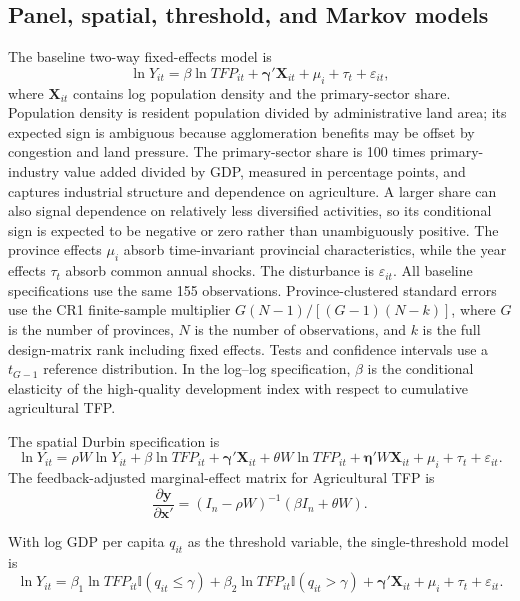 \documentclass[sustainability,article,submit,moreauthors]{Definitions/mdpi}
\numberwithin{equation}{section}
\begin{document}
\subsection{Panel, spatial, threshold, and Markov models}

The baseline two-way fixed-effects model is
\begin{equation}
\ln Y_{it}=\beta\ln TFP_{it}+\bm{\gamma}'\bm{X}_{it}+\mu_i+\tau_t+\varepsilon_{it},
\label{eq:fe}
\end{equation}
where $\bm{X}_{it}$ contains log population density and the primary-sector
share. Population density is resident population divided by administrative
land area; its expected sign is ambiguous because agglomeration benefits may
be offset by congestion and land pressure. The primary-sector share is
100 times primary-industry value added divided by GDP, measured in
percentage points, and captures industrial
structure and dependence on agriculture. A larger share can also signal
dependence on relatively less diversified activities, so its conditional sign
is expected to be negative or zero rather than unambiguously positive. The province effects $\mu_i$
absorb time-invariant provincial characteristics, while the year effects
$\tau_t$ absorb common annual shocks. The disturbance is $\varepsilon_{it}$.
All baseline specifications use the same 155 observations. Province-clustered
standard errors use the CR1 finite-sample multiplier
$G(N-1)/[(G-1)(N-k)]$, where $G$ is the number of provinces, $N$ is the number
of observations, and $k$ is the full design-matrix rank including fixed
effects. Tests and confidence intervals use a $t_{G-1}$ reference
distribution. In the log--log specification, $\beta$
is the conditional elasticity of the high-quality development index with
respect to cumulative agricultural TFP.

The spatial Durbin specification is
\begin{equation}
\ln Y_{it}=\rho W\ln Y_{it}+\beta\ln TFP_{it}+\bm{\gamma}'\bm{X}_{it}
+\theta W\ln TFP_{it}+\bm{\eta}'W\bm{X}_{it}+\mu_i+\tau_t+\varepsilon_{it}.
\label{eq:sdm}
\end{equation}
The feedback-adjusted marginal-effect matrix for Agricultural TFP is
\begin{equation}
\frac{\partial \bm y}{\partial \bm x'}=(I_n-\rho W)^{-1}(\beta I_n+\theta W).
\label{eq:impact}
\end{equation}

With log GDP per capita $q_{it}$ as the threshold variable, the single-threshold model is
\begin{equation}
\ln Y_{it}=\beta_1\ln TFP_{it}\mathbb{I}(q_{it}\le\gamma)
+\beta_2\ln TFP_{it}\mathbb{I}(q_{it}>\gamma)
+\bm{\gamma}'\bm{X}_{it}+\mu_i+\tau_t+\varepsilon_{it}.
\label{eq:threshold}
\end{equation}
\end{document}
